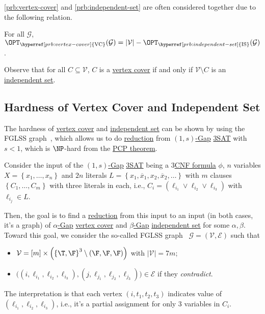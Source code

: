 \autoref{prb:vertex-cover} and \autoref{prb:independent-set} are often considered together due to the following relation.

\begin{claim}
	For all \(\mathcal{G} \), \(\OPT_{\hyperref[prb:vertex-cover]{\text{VC}}}(\mathcal{G} ) = \vert \mathcal{V} \vert - \OPT_{\hyperref[prb:independent-set]{\text{IS}}}(\mathcal{G} )\).
\end{claim}
\begin{explanation}
	Observe that for all \(C \subseteq \mathcal{V} \), \(C\) is a \hyperref[prb:vertex-cover]{vertex cover} if and only if \(\mathcal{V} \setminus C\) is an \hyperref[prb:independent-set]{independent set}.
\end{explanation}

\subsection{Hardness of Vertex Cover and Independent Set}
The hardness of \hyperref[prb:vertex-cover]{vertex cover} and \hyperref[prb:independent-set]{independent set} can be shown by using the FGLSS graph~\cite{10.1145/226643.226652}, which allows us to do \hyperref[def:reduction]{reduction} from \hyperref[def:c-s-Gap]{\((1, s)\)-Gap} \hyperref[prb:max-3SAT]{3SAT} with \(s < 1\), which is \(\NP\)-hard from the \hyperref[thm:PCP]{PCP theorem}.

Consider the input of the \hyperref[def:c-s-Gap]{\((1, s)\)-Gap} \hyperref[prb:max-3SAT]{3SAT} being a \hyperref[def:k-CNF]{\(3\)CNF formula} \(\phi \), \(n\) variables \(X=\left\{ x_1, \dots , x_n\right\}\) and \(2n\) literals \(L = \left\{ x_1, \overline{x}_1, x_2, \overline{x}_2, \dots \right\}\) with \(m\) clauses \(\left\{ C_1, \dots , C_m \right\} \) with three literals in each, i.e., \(C_i = (\ell _{i_1} \lor \ell _{i_2} \lor \ell _{i_3}) \) with \(\ell _{i_j}\in L\).

Then, the goal is to find a \hyperref[def:reduction]{reduction} from this input to an input (in both cases, it's a graph) of \hyperref[def:Gap]{\(\alpha\)-Gap} \hyperref[prb:vertex-cover]{vertex cover} and \hyperref[def:Gap]{\(\beta \)-Gap} \hyperref[prb:independent-set]{independent set} for some \(\alpha , \beta \). Toward this goal, we consider the so-called FGLSS graph~\cite{10.1145/226643.226652} \(\mathcal{G} =(\mathcal{V} , \mathcal{E} )\) such that
\begin{itemize}
	\item \(\mathcal{V} = [m]\times \left( \left\{ \T, \F \right\} ^3 \setminus (\F, \F, \F) \right)\) with \(\vert \mathcal{V}  \vert = 7m\);
	\item \(\big((i, \ell _{i_1}, \ell _{i_2}, \ell _{i_3}), (j, \ell _{j_1}, \ell _{j_2}, \ell _{j_3})\big)\in \mathcal{E} \) if they \emph{contradict}.
\end{itemize}
The interpretation is that each vertex \((i, t_1, t_2, t_3)\) indicates value of \((\ell _{i_1}, \ell _{i_2}, \ell _{i_3})\), i.e., it's a partial assignment for only \(3\) variables in \(C_i\).


